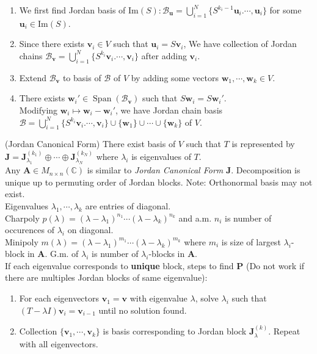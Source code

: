 \documentclass{article}
\theoremstyle{definition}
\DeclareMathOperator{\Span}{Span}
\renewcommand{\Im}{\text{Im}}
\begin{document}
\begin{enumerate}
    \item We first find Jordan basis of $\Im(S):\mathcal{B}_{\mathbf{u}}=\bigcup_{i=1}^{N}\{S^{k_{i}-1}\mathbf{u}_{i}.\cdots,\mathbf{u}_{i}\}$ for some $\mathbf{u}_{i}\in\Im(S)$.
    \item Since there exists $\mathbf{v}_{i}\in V$ such that $\mathbf{u}_{i}=S\mathbf{v}_{i}$, We have collection of Jordan chains $\mathcal{B}_{\mathbf{v}}=\bigcup_{i=1}^{N}\{S^{k_{i}}\mathbf{v}_{i}.\cdots,\mathbf{v}_{i}\}$ after adding $\mathbf{v}_{i}$.
    \item Extend $\mathcal{B}_{\mathbf{v}}$ to basis of $\mathcal{B}$ of $V$  by adding some vectors $\mathbf{w}_{1},\cdots,\mathbf{w}_{k}\in V$.
    \item There exists $\mathbf{w}_{i}'\in\Span(\mathcal{B}_{\mathbf{v}})$ such that $S\mathbf{w}_{i}=S\mathbf{w}_{i}'$.\\
    Modifying $\mathbf{w}_{i}\mapsto\mathbf{w}_{i}-\mathbf{w}_{i}'$, we have Jordan chain basis $\mathcal{B}=\bigcup_{i=1}^{N}\{S^{k_{i}}\mathbf{v}_{i}.\cdots,\mathbf{v}_{i}\}\cup\{\mathbf{w}_{1}\}\cup\cdots\cup\{\mathbf{w}_{k}\}$ of $V$.
\end{enumerate}
(Jordan Canonical Form) There exist basis of $V$ such that $T$ is represented by $\mathbf{J}=\mathbf{J}_{\lambda_{1}}^{(k_{1})}\oplus\cdots\oplus\mathbf{J}_{\lambda_{N}}^{(k_{N})}$ where $\lambda_{i}$ is eigenvalues of $T$.\\
Any $\mathbf{A}\in M_{n\times n}(\mathbb{C})$ is similar to \textit{Jordan Canonical Form} $\mathbf{J}$. Decomposition is unique up to permuting order of Jordan blocks.
Note: Orthonormal basis may not exist.\\
Eigenvalues $\lambda_{1},\cdots,\lambda_{k}$ are entries of diagonal.\\
Charpoly $p(\lambda)=(\lambda-\lambda_{1})^{n_{1}}\cdots(\lambda-\lambda_{k})^{n_{k}}$ and a.m. $n_{i}$ is number of occurences of $\lambda_{i}$ on diagonal.\\
Minipoly $m(\lambda)=(\lambda-\lambda_{1})^{m_{1}}\cdots(\lambda-\lambda_{k})^{m_{k}}$ where $m_{i}$ is size of largest $\lambda_{i}$-block in $\mathbf{A}$. G.m. of $\lambda_{i}$ is number of $\lambda_{i}$-blocks in $\mathbf{A}$.\\
If each eigenvalue corresponds to \textbf{unique} block, steps to find $\mathbf{P}$ (Do not work if there are multiples Jordan blocks of same eigenvalue):
\begin{enumerate}
    \item For each eigenvectors $\mathbf{v}_{1}=\mathbf{v}$ with eigenvalue $\lambda$, solve $\lambda_{i}$ such that $(T-\lambda I)\mathbf{v}_{i}=\mathbf{v}_{i-1}$ until no solution found.\\
    \item Collection $\{\mathbf{v}_{1},\cdots,\mathbf{v}_{k}\}$ is basis corresponding to Jordan block $\mathbf{J}_{\lambda}^{(k)}$. Repeat with all eigenvectors.
\end{enumerate}
\end{document}

